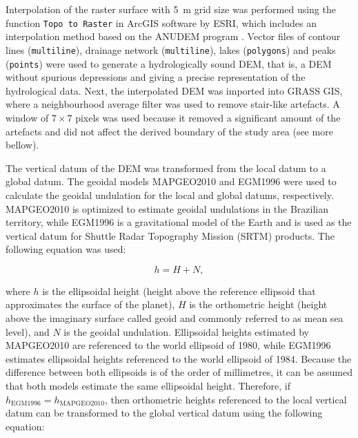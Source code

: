 
Interpolation of the raster surface with \SI{5}{\metre} grid size was performed using the function 
\texttt{Topo to Raster} in ArcGIS\rr{} software by ESRI, which includes an interpolation method 
based on the ANUDEM program \cite{Hutchinson1989}. Vector files of contour lines (\texttt{multiline}), 
drainage network (\texttt{multiline}), lakes (\texttt{polygons}) and peaks (\texttt{points}) were used to 
generate a hydrologically sound DEM, that is, a DEM without spurious depressions and giving a precise 
representation of the hydrological data. Next, the interpolated DEM was imported into GRASS GIS, where a 
neighbourhood average filter was used to remove stair-like artefacts. A window of $7 \times 7$ pixels was used 
because it removed a significant amount of the artefacts and did not affect the derived boundary of the study 
area (see more bellow).

The vertical datum of the DEM was transformed from the local datum to a global datum. The geoidal models 
MAPGEO2010 \cite{IBGE2010a} and EGM1996 \cite{LemoineEtAl1998} were used to calculate the geoidal undulation 
for the local and global datums, respectively. MAPGEO2010 is optimized to estimate geoidal undulations in the 
Brazilian territory, while EGM1996 is a gravitational model of the Earth and is used as the vertical datum for 
Shuttle Radar Topography Mission (SRTM) products. The following equation was used:

\begin{equation}\label{eqn:geoidal}
 h = H + N,
\end{equation}

\noindent where $h$ is the ellipsoidal height (height above the reference ellipsoid that approximates the 
surface of the planet), $H$ is the orthometric height (height above the imaginary surface called geoid and 
commonly referred to as mean sea level), and $N$ is the geoidal undulation. Ellipsoidal heights estimated by 
MAPGEO2010 are referenced to the world ellipsoid of 1980, while EGM1996 estimates ellipsoidal heights 
referenced to the world ellipsoid of 1984. Because the difference between both ellipsoids is of the order of 
millimetres, it can be assumed that both models estimate the same ellipsoidal height. Therefore, if 
$h_{\text{EGM1996}} = h_{\text{MAPGEO2010}}$, then orthometric heights referenced to the local vertical datum 
can be transformed to the global vertical datum using the following equation:

